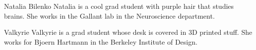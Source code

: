 \documentclass[journal]{IEEEtran}
\begin{document}
% 

\begin{IEEEbiography}{Natalia Bilenko}
Natalia is a cool grad student with purple hair that studies brains.  She works in the Gallant lab in the Neuroscience department.
\end{IEEEbiography}

\begin{IEEEbiography}{Valkyrie}
Valkyrie is a grad student whose desk is covered in 3D printed stuff.  She works for Bjoern Hartmann in the Berkeley Institute of Design.
\end{IEEEbiography}








\end{document}
